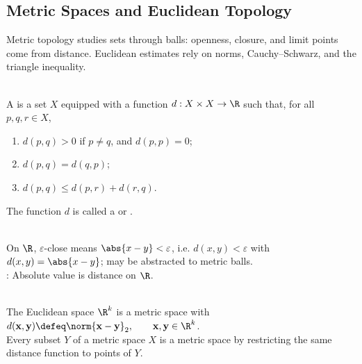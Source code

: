 \subsection{Metric Spaces and Euclidean Topology}\label{subsec:metric-spaces-and-euclidean-topology}

%


Metric topology studies sets through balls: openness, closure, and limit points come from distance. Euclidean estimates rely on norms, Cauchy--Schwarz, and the triangle inequality.

\begin{definition} \label{def:metric-space} \\
A  is a set $X$ equipped with a function $d:X\times X\to\R$ such that, for all $p,q,r\in X$,
\begin{enumerate}[label=\roman*.]
\setlength{\itemsep}{0pt}
\item $d(p,q)>0$ if $p\neq q$, and $d(p,p)=0$;
\item $d(p,q)=d(q,p)$;
\item $d(p,q)\leq d(p,r)+d(r,q)$.
\end{enumerate}
The function $d$ is called a  or .
\end{definition}

\begin{perspective} \label{per:epsilon-closeness-to-metric-language} \\
On $\R$, $\varepsilon$-close means $\abs{x-y}<\varepsilon$, i.e. $d(x,y)<\varepsilon$ with $d(x,y)=\abs{x-y}$; may be abstracted to metric balls.\\
: Absolute value is distance on $\R$.
\end{perspective}

\begin{example} \label{ex:euclidean-metric-and-subspaces} \\
The Euclidean space $\R^k$ is a metric space with $d(\mathbf{x},\mathbf{y})\defeq\norm{\mathbf{x}-\mathbf{y}}_2,\qquad \mathbf{x},\mathbf{y}\in\R^k$.\\
Every subset $Y$ of a metric space $X$ is a metric space by restricting the same distance function to points of $Y$.
\end{example}

